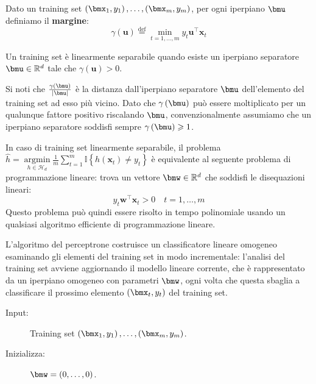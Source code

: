 \documentclass[\main/main.tex]{subfiles}
\begin{document}
\begin{multicols}{2}
\begin{theorem}
\end{theorem}
\begin{definition}
    Dato un training set \(\examples{m}\), per ogni iperpiano \(\bmu\) definiamo il \textbf{margine}:
    \[\gamma(\boldsymbol{u}) \stackrel{\mathrm{def}}{=} \min _{t=1, \ldots, m} y_{t} \boldsymbol{u}^{\top} \boldsymbol{x}_{t}\]
\end{definition}
\begin{definition}
    Un training set è linearmente separabile quando esiste un iperpiano separatore \(\bmu \in \R^d\) tale che \(\gamma(\boldsymbol{u})>0\).
    
    Si noti che \(\frac{\gamma\rnd{\bmu}}{\abs{\bmu}}\) è la distanza dall'iperpiano separatore \(\bmu\) dell'elemento del training set ad esso più vicino. Dato che \(\gamma\rnd{\bmu}\) può essere moltiplicato per un qualunque fattore positivo riscalando \(\bmu\), convenzionalmente assumiamo che un iperpiano separatore soddisfi sempre \(\gamma\rnd{\bmu}\geq 1\).
\end{definition}
\begin{observation}
    In caso di training set linearmente separabile, il problema \(\widehat{h}=\underset{h \in \mathcal{H}_{d}}{\operatorname{argmin}} \frac{1}{m} \sum_{t=1}^{m} \mathbb{I}\left\{h\left(\boldsymbol{x}_{t}\right) \neq y_{t}\right\}\) è equivalente al seguente problema di programmazione lineare: trova un vettore \(\bmw \in \R^d\) che soddisfi le disequazioni lineari:
    \[y_{t} \boldsymbol{w}^{\top} \boldsymbol{x}_{t}>0 \quad t=1, \ldots, m\]
    Questo problema può quindi essere risolto in tempo polinomiale usando un qualsiasi algoritmo efficiente di programmazione lineare.
\end{observation}
\begin{definition}[Perceptrone]
    L'algoritmo del perceptrone costruisce un classificatore lineare omogeneo esaminando gli elementi del training set in modo incrementale: l'analisi del training set avviene aggiornando il modello lineare corrente, che è rappresentato da un iperpiano omogeneo con parametri \(\bmw\), ogni volta che questa sbaglia a classificare il prossimo elemento \(\rnd{\bmx_t, y_t}\) del training set.
    \begin{description}
        \item[Input:] Training set \(\examples{m}\).
        \item[Inizializza:] \(\bmw = \rnd{0,\ldots,0}\).

\end{description}
\end{definition}
\end{multicols}
\end{document}
